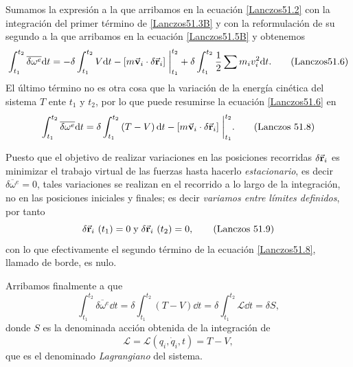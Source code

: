 \documentclass[12pt, spanish, a4paper, ]{article}
\begin{document}
Sumamos la expresión a la que arribamos en la ecuación \eqref{Lanczos51.2} con la integración del primer término de \eqref{Lanczos51.3B} y con la reformulación de su segundo a la que arribamos en la ecuación \eqref{Lanczos51.5B} y obtenemos
\begin{equation}\label{Lanczos51.6}
	\int^{t_2}_{t_1} \overline{\delta \omega^e} \dd t=
	- \delta \int^{t_2}_{t_1} V \dd t 
	- \left[ m \va{v}_i \cdot \delta \va{r}_i \right]\eval^{t_2}_{t_1}
	+ \delta \int^{t_2}_{t_1} \frac{1}{2} \sum m_i v_i^2 \dd t .
	\tag{Lanczos51.6}
\end{equation}
El último término no es otra cosa que la variación de la energía cinética del sistema \(T\) ente \(t_1\) y \(t_2\), por lo que puede resumirse la ecuación \eqref{Lanczos51.6} en
\begin{equation}\label{Lanczos51.8}
    \int^{t_2}_{t_1} \overline{\delta \omega^e} \dd t= \delta \int^{t_2}_{t_1} \left(T - V \right) \dd t - \left[ m \va{v}_i \cdot \delta \va{r}_i \right]\eval^{t_2}_{t_1}.
    \tag{Lanczos 51.8}
\end{equation}

Puesto que el objetivo de realizar variaciones en las posiciones recorridas \(\delta \va{r}_i\) es minimizar el trabajo virtual de las fuerzas hasta hacerlo \emph{estacionario}, es decir \(\overline{\delta \omega^e}= 0\), tales variaciones se realizan en el recorrido a lo largo de la integración, no en las posiciones iniciales y finales; es decir \emph{variamos entre límites definidos}, por tanto
\begin{equation}\label{Lanczos51.9}
	\delta \va{r}_i\ (t_1)=0 \; \mathrm{y} \; 
	\delta \va{r}_i\ (t_2)=0,
	\tag{Lanczos 51.9}
\end{equation}
con lo que efectivamente el segundo término de la ecuación \eqref{Lanczos51.8}, llamado de borde, es nulo.

Arribamos finalmente a que
\begin{equation}\label{Lanczos51.10}
    \int^{t_2}_{t_1} \overline{\delta \omega^e} \dd t=
	\delta \int^{t_2}_{t_1} \left(T - V \right) \dd t= 
	\delta \int^{t_2}_{t_1} \mathcal{L} \dd t= \delta S,
    \tag{Lanczos 51.10}
\end{equation}
donde \(S\) es la denominada acción obtenida de la integración de
\begin{equation}\label{Lanczos51.11}
	\mathcal{L} = \mathcal{L}(q_i, \dot{q}_i, t) = T - V,
    \tag{Lanczos 51.11}
\end{equation}
que es el denominado \emph{Lagrangiano} del sistema.
\end{document}
